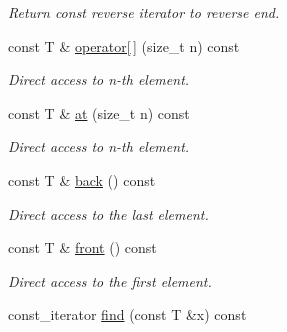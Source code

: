 \begin{DoxyCompactItemize}
\begin{DoxyCompactList}\small\item\em Return const reverse iterator to reverse end. \end{DoxyCompactList}\item 
const T \& \hyperlink{classmerlin_1_1set_a554ef509882e4d14cc0c8dd772eff7a9}{operator\mbox{[}$\,$\mbox{]}} (size\+\_\+t n) const \hypertarget{classmerlin_1_1set_a554ef509882e4d14cc0c8dd772eff7a9}{}\label{classmerlin_1_1set_a554ef509882e4d14cc0c8dd772eff7a9}

\begin{DoxyCompactList}\small\item\em Direct access to n-\/th element. \end{DoxyCompactList}\item 
const T \& \hyperlink{classmerlin_1_1set_af666381d39987a3a00787b0f1e7b9fb3}{at} (size\+\_\+t n) const \hypertarget{classmerlin_1_1set_af666381d39987a3a00787b0f1e7b9fb3}{}\label{classmerlin_1_1set_af666381d39987a3a00787b0f1e7b9fb3}

\begin{DoxyCompactList}\small\item\em Direct access to n-\/th element. \end{DoxyCompactList}\item 
const T \& \hyperlink{classmerlin_1_1set_af82e83415c527fcfeb58be6b52a90e50}{back} () const \hypertarget{classmerlin_1_1set_af82e83415c527fcfeb58be6b52a90e50}{}\label{classmerlin_1_1set_af82e83415c527fcfeb58be6b52a90e50}

\begin{DoxyCompactList}\small\item\em Direct access to the last element. \end{DoxyCompactList}\item 
const T \& \hyperlink{classmerlin_1_1set_af270bbb3466f328017c06624c134c927}{front} () const \hypertarget{classmerlin_1_1set_af270bbb3466f328017c06624c134c927}{}\label{classmerlin_1_1set_af270bbb3466f328017c06624c134c927}

\begin{DoxyCompactList}\small\item\em Direct access to the first element. \end{DoxyCompactList}\item 
const\+\_\+iterator \hyperlink{classmerlin_1_1set_a7006853510da98c34586a5fc07a43187}{find} (const T \&x) const \hypertarget{classmerlin_1_1set_a7006853510da98c34586a5fc07a43187}{}\label{classmerlin_1_1set_a7006853510da98c34586a5fc07a43187}


\end{DoxyCompactItemize}
